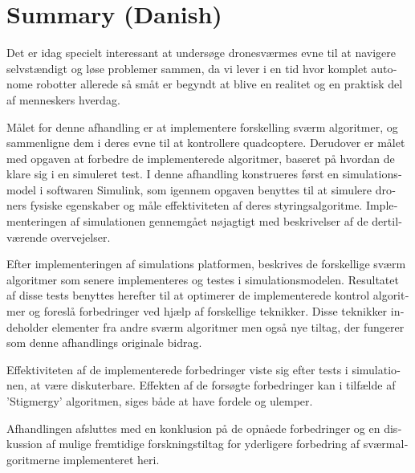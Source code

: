 \chapter{Summary (Danish)}
\begin{otherlanguage}{danish}

Det er idag specielt interessant at undersøge dronesværmes evne til at navigere selvstændigt og løse problemer sammen, da vi lever i en tid hvor komplet autonome robotter allerede så småt er begyndt at blive en realitet og en praktisk del af menneskers hverdag.  

Målet for denne afhandling er at implementere forskelling sværm algoritmer, og sammenligne dem i deres evne til at kontrollere quadcoptere. Derudover er målet med opgaven at forbedre de implementerede algoritmer, baseret på hvordan de klare sig i en simuleret test. 
I denne afhandling konstrueres først en simulationsmodel i softwaren Simulink, som igennem opgaven benyttes til at simulere droners fysiske egenskaber og måle effektiviteten af deres styringsalgoritme. Implementeringen af simulationen gennemgået nøjagtigt med beskrivelser af de dertilværende overvejelser. 

Efter implementeringen af simulations platformen, beskrives de forskellige sværm algoritmer som senere implementeres og testes i simulationsmodelen. Resultatet af disse tests benyttes herefter til at optimerer de implementerede kontrol algoritmer og foreslå forbedringer ved hjælp af forskellige teknikker. Disse teknikker indeholder elementer fra andre sværm algoritmer men også nye tiltag, der fungerer som denne afhandlings originale bidrag. 

Effektiviteten af de implementerede forbedringer viste sig efter tests i simulationen, at være diskuterbare. Effekten af de forsøgte forbedringer kan i tilfælde af 'Stigmergy' algoritmen, siges både at have fordele og ulemper. 

Afhandlingen afsluttes med en konklusion på de opnåede forbedringer og en diskussion af mulige fremtidige forskningstiltag for yderligere forbedring af sværmalgoritmerne implementeret heri.

\end{otherlanguage}